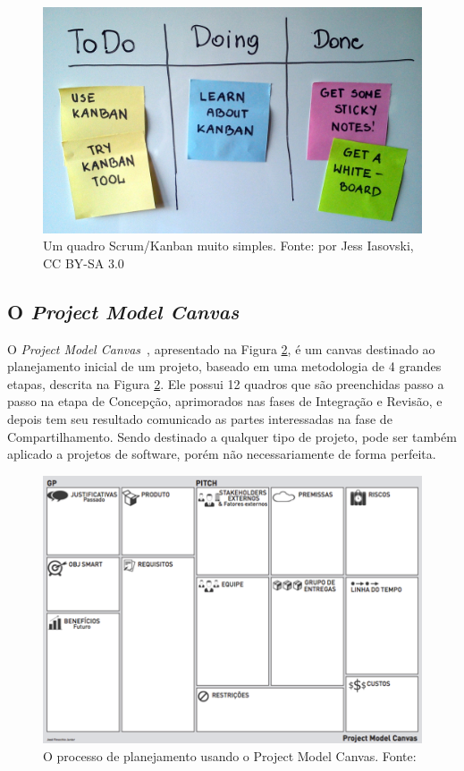 \documentclass[fontsize=12pt, a4paper,pagesize=auto,toc=listof, ,twoside,chapterprefix=false,appendixprefix=true,open=right]{scrbook}
\newcommand{\othersize}{0.7\linewidth}
\begin{document}
\begin{figure}
    \centering
    \includegraphics[width=\othersize]{imagens/Simple-kanban-board-.jpg}
    \caption{Um quadro Scrum/Kanban muito simples. Fonte:  por Jess Iasovski, CC BY-SA 3.0 }
    \label{fig:kanban}
\end{figure}

\subsection{O \textit{Project Model Canvas}}

O \textit{Project Model Canvas}~\citep{finocchio:2013}, apresentado na Figura \ref{fig:pmcp}, é um canvas destinado ao planejamento inicial de um projeto, baseado em uma metodologia de 4 grandes etapas, descrita na Figura \ref{fig:pmcp}. Ele possui 12 quadros que são preenchidas passo a passo na etapa de Concepção,  aprimorados nas fases de Integração e Revisão, e depois tem seu resultado comunicado as partes interessadas na fase de Compartilhamento. Sendo destinado a qualquer tipo de projeto, pode ser também aplicado a projetos de software, porém não necessariamente de forma perfeita.

\begin{figure}
    \centering
    \includegraphics[width=\othersize]{imagens/ProjectMdoel Canvas.png}
    \caption{O processo de planejamento usando o Project Model Canvas. Fonte: \citet{finocchio:2013}}
    \label{fig:pmcp}
\end{figure}
\end{document}
